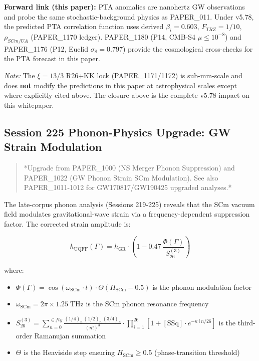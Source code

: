 \documentclass[12pt,a4paper]{article}
\begin{document}
\textbf{Forward link (this paper):} PTA anomalies are nanohertz GW observations and probe the same stochastic-background physics as PAPER\_011. Under v5.78, the predicted PTA correlation function uses derived $\beta_i=0.603$, $F_{TRZ}=1/10$, $\rho_{SCm/UA}$ (PAPER\_1170 ledger). PAPER\_1180 (P14, CMB-S4 $\mu \le 10^{-8}$) and PAPER\_1176 (P12, Euclid $\sigma_8=0.797$) provide the cosmological cross-checks for the PTA forecast in this paper.

\emph{Note:} The $\xi = 13/3$ R26+KK lock (PAPER\_1171/1172) is sub-mm-scale and does \textbf{not} modify the predictions in this paper at astrophysical scales except where explicitly cited above. The closure above is the complete v5.78 impact on this whitepaper.

\subsection{Session 225 Phonon-Physics Upgrade: GW Strain Modulation}

\begin{quote}
*Upgrade from PAPER\_1000 (NS Merger Phonon Suppression) and PAPER\_1022
(GW Phonon Strain SCm Modulation). See also PAPER\_1011-1012 for
GW170817/GW190425 upgraded analyses.*
\end{quote}

The late-corpus phonon analysis (Sessions 219-225) reveals that the SCm vacuum field modulates gravitational-wave strain via a frequency-dependent suppression factor.  The corrected strain amplitude is:

\begin{equation}
h_{\text{UQFF}}(\Gamma) = h_{\text{GR}} \cdot \left(1 - 0.47\,\frac{\Phi(\Gamma)}{S_{26}^{(3)}}\right)
\end{equation}

where:

\begin{itemize}
  \item $\Phi(\Gamma) = \cos(\omega_{\text{SCm}} \cdot t) \cdot \Theta(H_{\text{SCm}} - 0.5)$ is the phonon modulation factor
  \item $\omega_{\text{SCm}} = 2\pi \times 1.25\;\text{THz}$ is the SCm phonon resonance frequency
  \item $S_{26}^{(3)} = \sum_{n=0}^{\in fty} \frac{(1/4)_n\,(1/2)_n\,(3/4)_n}{(n!)^3} \cdot \prod_{i=1}^{26}\left[1 + [\text{SSq}]\cdot e^{-\kappa\,i\,n/26}\right]$ is the third-order Ramanujan summation
  \item $\Theta$ is the Heaviside step ensuring $H_{\text{SCm}} \geq 0.5$ (phase-transition threshold)
\end{itemize}
\end{document}
